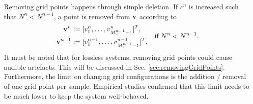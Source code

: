 \documentclass[fleqn]{jaes}
\begin{document}
Removing grid points happens through simple deletion. If $c^n$ is increased such that $N^n < N^{n-1}$, a point is removed from $\mathbf{v}$ according to
\begin{equation}\label{eq:removePoint}
\begin{aligned}
    \v^n &:= [v_1^n, \hdots, v_{M_v^{n-1}-1}^n]^T,\\
    \v^{n-1} &:= [v_1^{n-1}, \hdots, v_{M_v^{n-1}-1}^{n-1}]^T,
    \end{aligned} \quad \text{if } N^n < N^{n-1}.
\end{equation}
It must be noted that for lossless systems, removing grid points could cause audible artefacts. This will be discussed in Sec. \ref{sec:removingGridPoints}. Furthermore, the limit on changing grid configurations is the addition / removal of one grid point per sample. Empirical studies confirmed that this limit needs to be much lower to keep the system well-behaved. %
\end{document}
